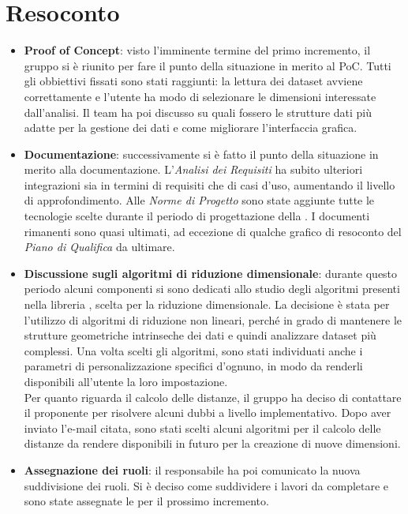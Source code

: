 \section{Resoconto}
\begin{itemize}
\item \textbf{Proof of Concept}: visto l'imminente termine del primo incremento, il gruppo si è riunito per fare il punto della situazione in merito al PoC. Tutti gli obbiettivi fissati sono stati raggiunti: la lettura dei dataset avviene correttamente e l'utente ha modo di selezionare le dimensioni interessate dall'analisi. Il team ha poi discusso su quali fossero le strutture dati più adatte per la gestione dei dati e come migliorare l'interfaccia grafica. 

\item\textbf{Documentazione}: successivamente si è fatto il punto della situazione in merito alla documentazione. L'\textit{Analisi dei Requisiti} ha subito ulteriori integrazioni sia in termini di requisiti che di casi d'uso, aumentando il livello di approfondimento. Alle \textit{Norme di Progetto} sono state aggiunte tutte le tecnologie scelte durante il periodo di progettazione della . I documenti rimanenti sono quasi ultimati, ad eccezione di qualche grafico di resoconto del \textit{Piano di Qualifica} da ultimare.

\item\textbf{Discussione sugli algoritmi di riduzione dimensionale}: durante questo periodo alcuni componenti si sono dedicati allo studio degli algoritmi presenti nella libreria \textit{}, scelta per la riduzione dimensionale. La decisione è stata per l'utilizzo di algoritmi di riduzione non lineari, perché in grado di mantenere le strutture geometriche intrinseche dei dati e quindi analizzare dataset più complessi. Una volta scelti gli algoritmi, sono stati individuati anche i parametri di personalizzazione specifici d'ognuno, in modo da renderli disponibili all'utente la loro impostazione.\\ Per quanto riguarda il calcolo delle distanze, il gruppo ha deciso di contattare il proponente per risolvere alcuni dubbi a livello implementativo. Dopo aver inviato l'e-mail citata, sono stati scelti alcuni algoritmi per il calcolo delle distanze da rendere disponibili in futuro per la creazione di nuove dimensioni.

\item \textbf{Assegnazione dei ruoli}: il responsabile ha poi comunicato la nuova suddivisione dei ruoli. Si è deciso come suddividere i lavori da completare e sono state assegnate le  per il prossimo incremento.
\end{itemize}

\newpage